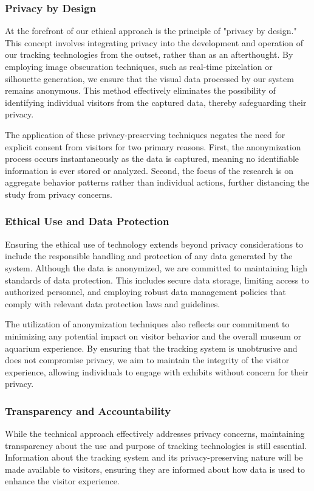 \subsubsection{Privacy by Design}
At the forefront of our ethical approach is the principle of "privacy by design." This concept involves integrating privacy into the development and operation of our tracking technologies from the outset, rather than as an afterthought. By employing image obscuration techniques, such as real-time pixelation or silhouette generation, we ensure that the visual data processed by our system remains anonymous. This method effectively eliminates the possibility of identifying individual visitors from the captured data, thereby safeguarding their privacy.

The application of these privacy-preserving techniques negates the need for explicit consent from visitors for two primary reasons. First, the anonymization process occurs instantaneously as the data is captured, meaning no identifiable information is ever stored or analyzed. Second, the focus of the research is on aggregate behavior patterns rather than individual actions, further distancing the study from privacy concerns.

\subsubsection{Ethical Use and Data Protection}
Ensuring the ethical use of technology extends beyond privacy considerations to include the responsible handling and protection of any data generated by the system. Although the data is anonymized, we are committed to maintaining high standards of data protection. This includes secure data storage, limiting access to authorized personnel, and employing robust data management policies that comply with relevant data protection laws and guidelines.

The utilization of anonymization techniques also reflects our commitment to minimizing any potential impact on visitor behavior and the overall museum or aquarium experience. By ensuring that the tracking system is unobtrusive and does not compromise privacy, we aim to maintain the integrity of the visitor experience, allowing individuals to engage with exhibits without concern for their privacy.

\subsubsection{Transparency and Accountability}
While the technical approach effectively addresses privacy concerns, maintaining transparency about the use and purpose of tracking technologies is still essential. Information about the tracking system and its privacy-preserving nature will be made available to visitors, ensuring they are informed about how data is used to enhance the visitor experience.

